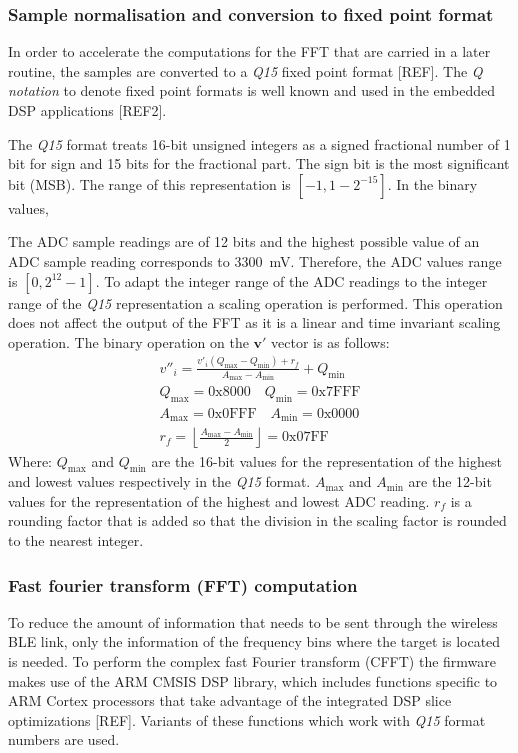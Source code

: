 \subsubsection{Sample normalisation and conversion to fixed point format}

In order to accelerate the computations for the FFT that are carried in a later routine, the samples are converted to a \textit{Q15} fixed point format [REF]. The \textit{Q notation} to denote fixed point formats is well known and used in the embedded DSP applications [REF2].

The \textit{Q15} format treats 16-bit unsigned integers as a signed fractional number of 1 bit for sign and 15 bits for the fractional part. The sign bit is the most significant bit (MSB). The range of this representation is $[-1, 1-2^{-15}]$. In the binary values,

The ADC sample readings are of 12 bits and the highest possible value of an ADC sample reading corresponds to \SI{3300}{\milli\volt}. Therefore, the ADC values range is $[0, 2^{12}-1]$. To adapt the integer range of the ADC readings to the integer range of the \textit{Q15} representation a scaling operation is performed. This operation does not affect the output of the FFT as it is a linear and time invariant scaling operation. The binary operation on the $\mathbf{v'}$ vector is as follows:
\begin{gather}
	v''_i = \frac{v'_i(Q_{\max}-Q_{\min})+r_f}{A_{\max}-A_{\min}} + Q_{\min}\\
	Q_{\max} = \mathrm{0x8000}\quad Q_{\min} = \mathrm{0x7FFF} \\
	A_{\max} = \mathrm{0x0FFF}\quad A_{\min} = \mathrm{0x0000} \\
	r_f = \left\lfloor \frac{A_{\max}-A_{\min}}{2} \right\rfloor = \mathrm{0x07FF}
\end{gather}
Where: $Q_{\max}$ and $Q_{\min}$ are the 16-bit values for the representation of the highest and lowest values respectively in the \textit{Q15} format. $A_{\max}$ and $A_{\min}$ are the 12-bit values for the representation of the highest and lowest ADC reading. $r_f$ is a rounding factor that is added so that the division in the scaling factor is rounded to the nearest integer.

\subsubsection{Fast fourier transform (FFT) computation}

To reduce the amount of information that needs to be sent through the wireless BLE link, only the information of the frequency bins where the target is located is needed. To perform the complex fast Fourier transform (CFFT) the firmware makes use of the ARM CMSIS DSP library, which includes functions specific to ARM Cortex processors that take advantage of the integrated DSP slice optimizations [REF]. Variants of these functions which work with \textit{Q15} format numbers are used.

